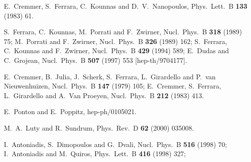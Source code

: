 \documentclass[a4paper,12pt]{article}
\begin{document}
\begin{thebibliography}{99}
E.~Cremmer, S.~Ferrara, C.~Kounnas and D.~V.~Nanopoulos,
Phys.\ Lett.\ B {\bf 133} (1983) 61.


S.~Ferrara, C.~Kounnas, M.~Porrati and F.~Zwirner,
Nucl.\ Phys.\ B {\bf 318} (1989) 75;
M.~Porrati and F.~Zwirner,
Nucl.\ Phys.\ B {\bf 326} (1989) 162;
S.~Ferrara, C.~Kounnas and F.~Zwirner,
Nucl.\ Phys.\ B {\bf 429} (1994) 589;
E.~Dudas and C.~Grojean,
Nucl.\ Phys.\ B {\bf 507} (1997) 553
[hep-th/9704177].




E.~Cremmer, B.~Julia, J.~Scherk, S.~Ferrara, L.~Girardello and P.~van Nieuwenhuizen,
Nucl.\ Phys.\ B {\bf 147} (1979) 105;
E.~Cremmer, S.~Ferrara, L.~Girardello and A.~Van Proeyen,
Nucl.\ Phys.\ B {\bf 212} (1983) 413.




E.~Ponton and E.~Poppitz,
hep-ph/0105021.


M.~A.~Luty and R.~Sundrum,
Phys.\ Rev.\ D {\bf 62} (2000) 035008.



I.~Antoniadis, S.~Dimopoulos and G.~Dvali,
Nucl.\ Phys.\ B {\bf 516} (1998) 70;
I.~Antoniadis and M.~Quiros,
Phys.\ Lett.\ B {\bf 416} (1998) 327;




\end{thebibliography}
\end{document}
